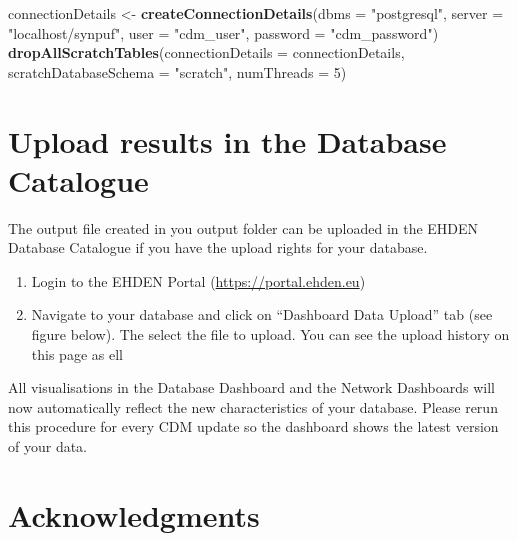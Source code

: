 \documentclass[
]{article}
\newenvironment{Shaded}{\begin{snugshade}}{\end{snugshade}}
\newcommand{\DataTypeTok}[1]{\textcolor[rgb]{0.13,0.29,0.53}{#1}}
\newcommand{\DecValTok}[1]{\textcolor[rgb]{0.00,0.00,0.81}{#1}}
\newcommand{\KeywordTok}[1]{\textcolor[rgb]{0.13,0.29,0.53}{\textbf{#1}}}
\newcommand{\NormalTok}[1]{#1}
\newcommand{\StringTok}[1]{\textcolor[rgb]{0.31,0.60,0.02}{#1}}
\providecommand{\tightlist}{%
  \setlength{\itemsep}{0pt}\setlength{\parskip}{0pt}}
\begin{document}
\begin{Shaded}
\begin{Highlighting}[]
\NormalTok{connectionDetails <-}\StringTok{ }\KeywordTok{createConnectionDetails}\NormalTok{(}\DataTypeTok{dbms =} \StringTok{"postgresql"}\NormalTok{, }
                                             \DataTypeTok{server =} \StringTok{"localhost/synpuf"}\NormalTok{, }
                                             \DataTypeTok{user =} \StringTok{"cdm_user"}\NormalTok{, }
                                             \DataTypeTok{password =} \StringTok{"cdm_password"}\NormalTok{)}
\KeywordTok{dropAllScratchTables}\NormalTok{(}\DataTypeTok{connectionDetails =}\NormalTok{ connectionDetails, }
                     \DataTypeTok{scratchDatabaseSchema =} \StringTok{"scratch"}\NormalTok{, }\DataTypeTok{numThreads =} \DecValTok{5}\NormalTok{)}
\end{Highlighting}
\end{Shaded}

\hypertarget{upload-results-in-the-database-catalogue}{%
\section{Upload results in the Database
Catalogue}\label{upload-results-in-the-database-catalogue}}

The output file created in you output folder can be uploaded in the
EHDEN Database Catalogue if you have the upload rights for your
database.

\begin{enumerate}
\def\labelenumi{\arabic{enumi}.}
\tightlist
\item
  Login to the EHDEN Portal (\url{https://portal.ehden.eu})
\item
  Navigate to your database and click on ``Dashboard Data Upload'' tab
  (see figure below). The select the file to upload. You can see the
  upload history on this page as ell
\end{enumerate}

All visualisations in the Database Dashboard and the Network Dashboards
will now automatically reflect the new characteristics of your database.
Please rerun this procedure for every CDM update so the dashboard shows
the latest version of your data.

\hypertarget{acknowledgments}{%
\section{Acknowledgments}\label{acknowledgments}}
\end{document}
